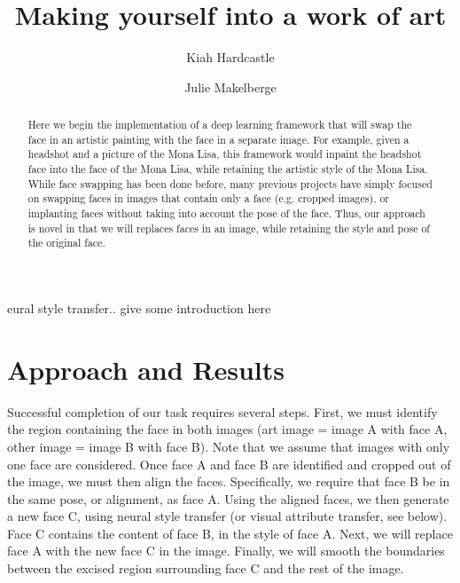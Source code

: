 \documentclass{pnastwo2}
\begin{document}
\title{Making yourself into a work of art}

\author{Kiah Hardcastle
\and Julie Makelberge}


\maketitle

\begin{article}

\begin{abstract}

Here we begin the implementation of a deep learning framework that will swap the face in an artistic painting with the face in a separate image. For example, given a headshot and a picture of the Mona Lisa, this framework would inpaint the headshot face into the face of the Mona Lisa, while retaining the artistic style of the Mona Lisa. While face swapping has been done before, many previous projects have simply focused on swapping faces in images that contain only a face (e.g. cropped images), or implanting faces without taking into account the pose of the face. Thus, our approach is novel in that we will replaces faces in an image, while retaining the style and pose of the original face.

\end{abstract}

eural style transfer.. give some introduction here

\section{Approach and Results}

Successful completion of our task requires several steps. First, we must identify the region containing the face in both images (art image = image A with face A, other image = image B with face B). Note that we assume that images with only one face are considered. Once face A and face B are identified and cropped out of the image, we must then align the faces. Specifically, we require that face B be in the same pose, or alignment, as face A. Using the aligned faces, we then generate a new face C, using neural style transfer (or visual attribute transfer, see below). Face C contains the content of face B, in the style of face A. Next, we will replace face A with the new face C in the image. Finally, we will smooth the boundaries between the excised region surrounding face C and the rest of the image. 


\end{article}
\end{document}
